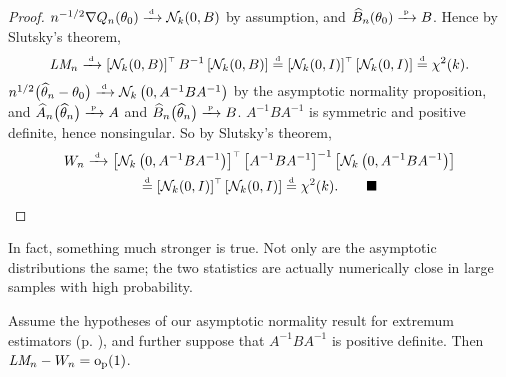 \documentclass[11pt,letterpaper,reqno,oneside]{article}
\begin{document}
\renewcommand{\qedsymbol}{}
\begin{proof}
	$n^{-1/2} \nabla Q_n(\theta_0) \xrightarrow{{\scriptscriptstyle \mathrm{\;d\;}}} \mathcal{N}_k(0,B)$ by assumption, and $\widehat{B}_n(\theta_0) \xrightarrow{{\scriptscriptstyle \mathrm{\;p\;}}} B$. Hence by Slutsky's theorem,
	\begin{equation*}
		\textit{LM}_n 
		\xrightarrow{{\scriptscriptstyle \mathrm{\;d\;}}} \left[ \mathcal{N}_k(0,B) \right]^{\scriptscriptstyle \top} 
		B^{-1} 
		\left[ \mathcal{N}_k(0,B) \right]
		\protect\overset{{\scriptscriptstyle \mathrm{d}}}{=} \left[ \mathcal{N}_k(0,I) \right]^{\scriptscriptstyle \top} 
		\left[ \mathcal{N}_k(0,I) \right]
		\protect\overset{{\scriptscriptstyle \mathrm{d}}}{=} \chi^2(k) .
	\end{equation*}
	$n^{1/2}\bigl( \widehat{\theta}_n - \theta_0 \bigr) \xrightarrow{{\scriptscriptstyle \mathrm{\;d\;}}} \mathcal{N}_k\left( 0, A^{-1} B A^{-1} \right)$ by the asymptotic normality proposition, and $\widehat{A}_n\bigl( \widehat{\theta}_n \bigr) \xrightarrow{{\scriptscriptstyle \mathrm{\;p\;}}} A$ and $\widehat{B}_n\bigl( \widehat{\theta}_n \bigr) \xrightarrow{{\scriptscriptstyle \mathrm{\;p\;}}} B$. $A^{-1} B A^{-1}$ is symmetric and positive definite, hence nonsingular. So by Slutsky's theorem,
	\begin{multline*}
		W_n 
		\xrightarrow{{\scriptscriptstyle \mathrm{\;d\;}}} \left[ \mathcal{N}_k\left( 0, A^{-1} B A^{-1} \right) \right]^{\scriptscriptstyle \top} 
		\left[ A^{-1} B A^{-1} \right]^{-1}
		\left[ \mathcal{N}_k\left( 0, A^{-1} B A^{-1} \right) \right]
		\\
		\protect\overset{{\scriptscriptstyle \mathrm{d}}}{=} \left[ \mathcal{N}_k(0,I) \right]^{\scriptscriptstyle \top} 
		\left[ \mathcal{N}_k(0,I) \right]
		\protect\overset{{\scriptscriptstyle \mathrm{d}}}{=} \chi^2(k) .
		\tag*{$\blacksquare$} \qedhere
	\end{multline*}
\end{proof}
\renewcommand{\qedsymbol}{$\blacksquare$}


In fact, something much stronger is true. Not only are the asymptotic distributions the same; the two statistics are actually numerically close in large samples with high probability.
%
\begin{proposition}
	Assume the hypotheses of our asymptotic normality result for extremum estimators (p. \pageref{proposition:asymptotic_normality}), and further suppose that $A^{-1} B A^{-1}$ is positive definite. Then $\textit{LM}_n - W_n = \mathrm{o}_{\mathrm{p}}(1)$.
\end{proposition}
\end{document}

